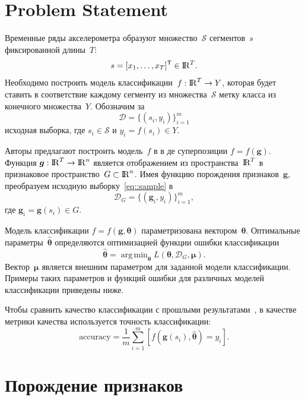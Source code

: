\documentclass{llncs}
\DeclareMathOperator*{\argmin}{arg\,min}
\newcommand{\T}{{\mbox{\scriptsize\sffamily\upshape\mdseries T}}}
\begin{document}
\section{Problem Statement}
Временные ряды акселерометра образуют множество~$\mathcal{S}$ сегментов~$s$ фиксированной длины~$T$:
\begin{equation}
s = [x_1, \dots, x_T]^{\T} \in \bbbr^T.
\label{eq::time_series}
\end{equation}
Необходимо построить модель классификации~$f: {\rm I\!R}^T \rightarrow Y$, которая будет ставить в соответствие каждому сегменту из множества~$\mathcal{S}$ метку класса из конечного множества~$Y$.
Обозначим за
\begin{equation}
	\mathcal{D} = \{(s_i, y_i)\}_{i=1}^m
	\label{eq::sample}
\end{equation}
исходная выборка, где $s_i \in \mathcal{S}$ и $y_i = f(s_i)\in Y$.

Авторы предлагают построить модель~$f$ в в де суперпозиции $f=f(\bm{g})$.
Функция $\bm{g}: {\rm I\!R}^T \rightarrow {\rm I\!R}^n$ является отображением из пространства~${\rm I\!R}^{T} $ в признаковое пространство~$G \subset {\rm I\!R}^n$.
Имея функцию порождения признаков~$\bm{g}$, преобразуем исходную выборку~\eqref{eq::sample} в
\[
	\mathcal{D}_G = \{(\bm{g}_i, y_i)\}_{i=1}^m,
\]
где $\bm{g}_i = \bm{g}(s_i) \in G$. 

Модель классификации $f=f(\bm{g}, \bm{\theta})$ параметризована вектором~$\boldsymbol{\theta}$. 
Оптимальные параметры~$\hat{\bm{\theta}}$ определяются оптимизацией функции ошибки классификации
\begin{equation}
\hat{\bm{\theta}} = \argmin_{\bm{\theta}} L(\bm{\theta}, \mathcal{D}_G, \bm{\mu}).
\label{eq::optimal_classification_params}
\end{equation}
Вектор~$\bm{\mu}$ является внешним параметром для заданной модели классификации. 
Примеры таких параметров и функций ошибки для различных моделей классификации приведены ниже.

Чтобы сравнить качество классификации с прошлыми результатами~\cite{karasikov2016feature,ivkin2015ts}, в качестве метрики качества используется точность классификации:
\begin{equation}
	\mathrm{accuracy} = \frac{1}{m} \sum_{i=1}^{m} \left[f\left(\bm{g}(s_i), \hat{\bm{\theta}} \right)= y_i\right].
	\label{eq::accuracy}
\end{equation}

\section{Порождение признаков}
\end{document}
